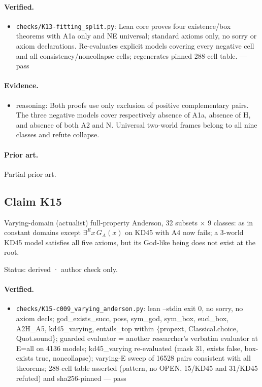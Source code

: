 \documentclass{article}
\begin{document}
\paragraph{Verified.}
\begin{itemize}
\item \texttt{checks/K13-fitting\_split.py}: Lean core proves four existence/box theorems with A1a only and NE universal; standard axioms only, no sorry or axiom declarations. Re-evaluates explicit models covering every negative cell and all consistency/noncollapse cells; regenerates pinned 288-cell table. --- pass
\end{itemize}

\paragraph{Evidence.}
\begin{itemize}
\item reasoning: Both proofs use only exclusion of positive complementary pairs. The three negative models cover respectively absence of A1a, absence of H, and absence of both A2 and N. Universal two-world frames belong to all nine classes and refute collapse.
\end{itemize}

\paragraph{Prior art.} Partial prior art.

\subsection*{Claim K15}

Varying-domain (actualist) full-property Anderson, 32 subsets $\times$ 9 classes: as in constant domains except $\exists^E x\,G_A(x)$ on KD45 with A4 now fails; a 3-world KD45 model satisfies all five axioms, but its God-like being does not exist at the root.

Status: derived · author check only.

\paragraph{Verified.}
\begin{itemize}
\item \texttt{checks/K15-c009\_varying\_anderson.py}: lean --stdin exit 0, no sorry, no axiom decls; god\_exists\_succ, poss, sym\_god, sym\_box, eucl\_box, A2H\_A5, kd45\_varying, entails\_top within \{propext, Classical.choice, Quot.sound\}; guarded evaluator = another researcher's verbatim evaluator at E=all on 4136 models; kd45\_varying re-evaluated (mask 31, exists false, box-exists true, noncollapse); varying-E sweep of 16528 pairs consistent with all theorems; 288-cell table asserted (pattern, no OPEN, 15/KD45 and 31/KD45 refuted) and sha256-pinned --- pass
\end{itemize}
\end{document}
